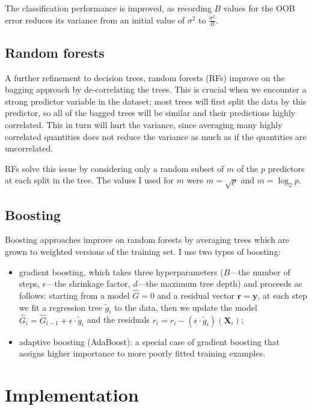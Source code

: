 \documentclass[11pt]{article}
\numberwithin{equation}{section}
\begin{document}
The classification performance is improved, as recording $B$ values for the OOB error reduces its variance from an initial value of $\sigma^2$ to $\frac{\sigma^2}{B}$.

\subsection{Random forests}

A further refinement to decision trees, random forests (RFs) improve on the bagging approach by de-correlating the trees. This is crucial when we encounter a strong predictor variable in the dataset; most trees will first split the data by this predictor, so all of the bagged trees will be similar and their predictions highly correlated. This in turn will hurt the variance, since averaging many highly correlated quantities does not reduce the variance as much as if the quantities are uncorrelated.

RFs solve this issue by considering only a random subset of $m$ of the $p$ predictors at each split in the tree. The values I used for $m$ were $m = \sqrt{p}$ and $m = \log_2p$.

\subsection{Boosting}

Boosting approaches improve on random forests by averaging trees which are grown to weighted versions of the training set. I use two types of boosting:
\begin{itemize}
\item gradient boosting, which takes three hyperparameters ($B$---the number of steps, $\epsilon$---the shrinkage factor, $d$---the maximum tree depth) and proceeds as follows: starting from a model $\hat{G} = 0$ and a residual vector $\mathbf{r} = \mathbf{y}$, at each step we fit a regression tree $\tilde{g}_i$ to the data, then we update the model $\hat{G}_i = \hat{G}_{i-1} + \epsilon \cdot \tilde{g}_i$ and the residuals $r_i = r_i - (\epsilon \cdot \tilde{g}_i)(\mathbf{X}_i)$;
\item adaptive boosting (AdaBoost): a special case of gradient boosting that assigns higher importance to more poorly fitted training examples.
\end{itemize}

\section{Implementation}
\end{document}
